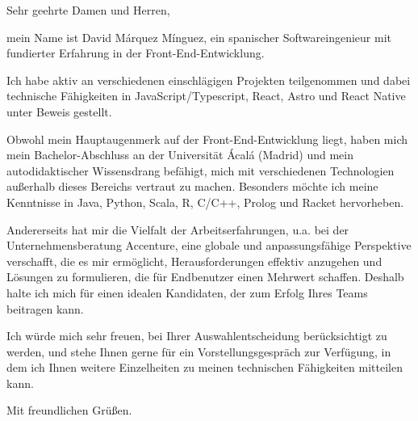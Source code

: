\documentclass[letterpaper,11pt]{letter}
\begin{document}
\begin{letter}{}
\address{Madrid, Spain}

\opening{Sehr geehrte Damen und Herren,}

mein Name ist David Márquez Mínguez, ein spanischer Softwareingenieur mit fundierter Erfahrung in der Front-End-Entwicklung. 

Ich habe aktiv an verschiedenen einschlägigen Projekten teilgenommen und dabei technische Fähigkeiten in JavaScript/Typescript, React, 
Astro und React Native unter Beweis gestellt. 

Obwohl mein Hauptaugenmerk auf der Front-End-Entwicklung liegt, haben mich mein Bachelor-Abschluss an der Universität Ácalá (Madrid) und 
mein autodidaktischer Wissensdrang befähigt, mich mit verschiedenen Technologien außerhalb dieses Bereichs vertraut zu machen. Besonders 
möchte ich meine Kenntnisse in Java, Python, Scala, R, C/C++, Prolog und Racket hervorheben. 

Andererseits hat mir die Vielfalt der Arbeitserfahrungen, u.a. bei der Unternehmensberatung Accenture, eine globale und anpassungsfähige
 Perspektive verschafft, die es mir ermöglicht, Herausforderungen effektiv anzugehen und Lösungen zu formulieren, die für Endbenutzer einen 
Mehrwert schaffen. Deshalb halte ich mich für einen idealen Kandidaten, der zum Erfolg Ihres Teams beitragen kann. 

Ich würde mich sehr freuen, bei Ihrer Auswahlentscheidung berücksichtigt zu werden, und stehe Ihnen gerne für ein Vorstellungsgespräch zur
Verfügung, in dem ich Ihnen weitere Einzelheiten zu meinen technischen Fähigkeiten mitteilen kann.

\signature{\vspace{-35pt}David Márquez Mínguez}
\closing{Mit freundlichen Grüßen.}




\end{letter}
\end{document}
